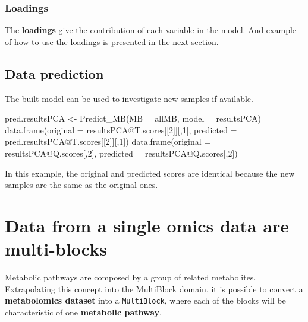 \documentclass[
]{book}
\newenvironment{Shaded}{\begin{snugshade}}{\end{snugshade}}
\newcommand{\AttributeTok}[1]{\textcolor[rgb]{0.77,0.63,0.00}{#1}}
\newcommand{\DecValTok}[1]{\textcolor[rgb]{0.00,0.00,0.81}{#1}}
\newcommand{\FunctionTok}[1]{\textcolor[rgb]{0.00,0.00,0.00}{#1}}
\newcommand{\NormalTok}[1]{#1}
\newcommand{\OtherTok}[1]{\textcolor[rgb]{0.56,0.35,0.01}{#1}}
\newcommand{\SpecialCharTok}[1]{\textcolor[rgb]{0.00,0.00,0.00}{#1}}
\begin{document}
\hypertarget{Loadings}{%
\subsection{Loadings}\label{Loadings}}

The \textbf{loadings} give the contribution of each variable in the model.
And example of how to use the loadings is presented in the next section.

\hypertarget{PART3}{%
\section{Data prediction}\label{PART3}}

The built model can be used to investigate new samples if available.

\begin{Shaded}
\begin{Highlighting}[]
\NormalTok{pred.resultsPCA }\OtherTok{\textless{}{-}} \FunctionTok{Predict\_MB}\NormalTok{(}\AttributeTok{MB =}\NormalTok{ allMB, }\AttributeTok{model =}\NormalTok{ resultsPCA)}
\FunctionTok{data.frame}\NormalTok{(}\AttributeTok{original =}\NormalTok{ resultsPCA}\SpecialCharTok{@}\NormalTok{T.scores[[}\DecValTok{2}\NormalTok{]][,}\DecValTok{1}\NormalTok{],}
           \AttributeTok{predicted =}\NormalTok{ pred.resultsPCA}\SpecialCharTok{@}\NormalTok{T.scores[[}\DecValTok{2}\NormalTok{]][,}\DecValTok{1}\NormalTok{])}
\FunctionTok{data.frame}\NormalTok{(}\AttributeTok{original =}\NormalTok{ resultsPCA}\SpecialCharTok{@}\NormalTok{Q.scores[,}\DecValTok{2}\NormalTok{],}
           \AttributeTok{predicted =}\NormalTok{ resultsPCA}\SpecialCharTok{@}\NormalTok{Q.scores[,}\DecValTok{2}\NormalTok{])}
\end{Highlighting}
\end{Shaded}

In this example, the original and predicted scores are identical because the
new samples are the same as the original ones.

\hypertarget{Section5}{%
\chapter{Data from a single omics data are multi-blocks}\label{Section5}}

Metabolic pathways are composed by a group of related metabolites. Extrapolating
this concept into the MultiBlock domain, it is possible to convert a
\textbf{metabolomics dataset} into a \texttt{MultiBlock}, where each of the blocks will be
characteristic of one \textbf{metabolic pathway}.
\end{document}
